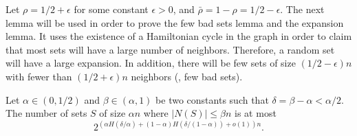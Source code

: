 Let %
$\rho= 1/2 +\epsilon$  %
for some constant $\epsilon>0$,
and %
%
$\bar{\rho}=1-\rho= 1/2-\epsilon$. 
The next lemma will be used in order to prove the few bad sets lemma and the expansion lemma. It uses the existence 
of  %
a Hamiltonian cycle in the graph in order to claim that most sets will have a large number of neighbors. Therefore, a random set will have a large expansion. In addition, there will be few sets of size 
%
$(1/2-\epsilon)n$    %
with %
fewer than %
%
$(1/2+\epsilon)n$   %
neighbors (\ie, %
%
few bad sets).

\begin{lemma}
	Let $\alpha\in (0, 1/2)$ and $\beta \in (\alpha, 1)$ be two constants such that $\delta=\beta-\alpha < \alpha/2$. The number of sets $S$ of size $\alpha n$ where $|N(S)|\leq \beta n$ is at most $$2^{(\alpha H(\delta/ \alpha)+(1-\alpha)H(\delta/(1-\alpha))+o(1))n}.$$
	\label{lem:ham_alpha_beta}
\end{lemma}
